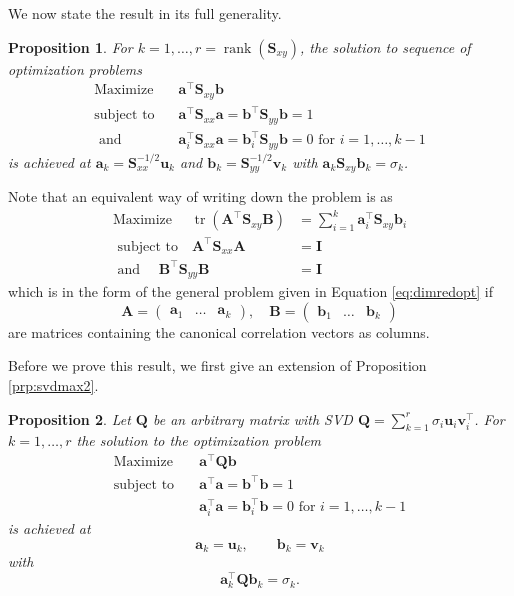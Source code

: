 \documentclass[
]{book}
\newtheorem{proposition}{Proposition}[chapter]
\theoremstyle{definition}
\theoremstyle{definition}
\theoremstyle{definition}
\theoremstyle{definition}
\theoremstyle{remark}
\begin{document}
We now state the result in its full generality.

\begin{proposition}
\protect\hypertarget{prp:ccafull}{}{\label{prp:ccafull} }For \(k=1, \ldots, r = \operatorname{rank}(\mathbf S_{xy})\), the solution to sequence of optimization problems
\begin{align}
\mbox{Maximize} \quad &\mathbf a^\top \mathbf S_{xy}\mathbf b\\
\mbox{subject to }  \;\;&\mathbf a^\top \mathbf S_{xx}\mathbf a=\mathbf b^\top\mathbf S_{yy} \mathbf b=1\\
\mbox{ and }\;\;\;&\mathbf a_i^\top \mathbf S_{xx}\mathbf a=\mathbf b_i^\top \mathbf S_{yy}\mathbf b= 0 \mbox{ for }i=1, \ldots, k-1
\end{align}
is achieved at \(\mathbf a_k = \mathbf S_{xx}^{-1/2}\mathbf u_k\) and \(\mathbf b_k=\mathbf S_{yy}^{-1/2}\mathbf v_k\) with \(\mathbf a_k \mathbf S_{xy}\mathbf b_k = \sigma_k\).
\end{proposition}
Note that an equivalent way of writing down the problem is as
\begin{align*}
\mbox{Maximize } \quad \operatorname{tr}(\mathbf A^\top \mathbf S_{xy}\mathbf B) &= \sum_{i=1}^k \mathbf a_i^\top \mathbf S_{xy}\mathbf b_i\\
\mbox{ subject to} \quad \mathbf A^\top \mathbf S_{xx}\mathbf A&=\mathbf I\\
\mbox{ and }\quad \mathbf B^\top \mathbf S_{yy}\mathbf B&= \mathbf I
\end{align*}
which is in the form of the general problem given in Equation \eqref{eq:dimredopt} if \[\mathbf A= \begin{pmatrix}\mathbf a_1&\ldots &\mathbf a_k\end{pmatrix}, \quad \mathbf B= \begin{pmatrix}\mathbf b_1&\ldots &\mathbf b_k\end{pmatrix}\]
are matrices containing the canonical correlation vectors as columns.

Before we prove this result, we first give an extension of Proposition \ref{prp:svdmax2}.

\begin{proposition}
\protect\hypertarget{prp:svdopt3}{}{\label{prp:svdopt3} }Let \(\mathbf Q\) be an arbitrary matrix with SVD \(\mathbf Q= \sum_{k=1}^r \sigma_i \mathbf u_i \mathbf v^\top_i\).
For \(k=1, \ldots, r\) the solution to the optimization problem
\begin{align}
\mbox{Maximize}\quad  &\mathbf a^\top \mathbf Q\mathbf b\\
\mbox{subject to} \quad &\mathbf a^\top \mathbf a= \mathbf b^\top \mathbf b=1\\
&\mathbf a_i^\top\mathbf a= \mathbf b_i^\top\mathbf b= 0 \mbox{ for } i = 1, \ldots, k-1
  \end{align}
is achieved at
\[\mathbf a_k=\mathbf u_k, \qquad \mathbf b_k = \mathbf v_k\]
with
\[\mathbf a_k^\top \mathbf Q\mathbf b_k = \sigma_k.\]
\end{proposition}
\end{document}
